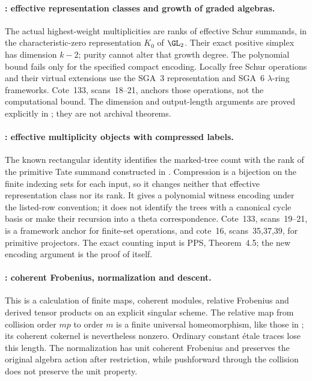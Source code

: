 \paragraph{: effective representation classes and growth of graded algebras.}
The actual highest-weight multiplicities are ranks of effective Schur
summands, in the characteristic-zero representation $K_0$ of $\GL_2$.
Their exact positive simplex has dimension $k-2$; purity cannot alter
that growth degree. The polynomial bound fails only for the specified
compact encoding. Locally free Schur operations and their virtual
extensions use the SGA~3 representation and SGA~6 $\lambda$-ring
frameworks. Cote~133, scans~18--21, anchors those operations, not the
computational bound. The dimension and output-length arguments are
proved explicitly in ; they are not archival theorems.

\paragraph{: effective multiplicity objects with compressed labels.}
The known rectangular identity identifies the marked-tree count with
the rank of the primitive Tate summand constructed in .
Compression is a bijection on the finite indexing sets for each input,
so it changes neither that effective representation class nor its rank.
It gives a polynomial witness encoding under the listed-row convention;
it does not identify the trees with a canonical cycle basis or make their
recursion into a theta correspondence. Cote~133, scans~19--21, is a
framework anchor for finite-set operations, and cote~16, scans~35,37,39,
for primitive projectors. The exact counting input is PPS, Theorem~4.5;
the new encoding argument is the proof of  itself.



\paragraph{: coherent Frobenius, normalization and descent.}

This is a calculation of finite maps, coherent modules, relative
Frobenius and derived tensor products on an explicit singular scheme.
The relative map from collision order $mp$ to order $m$ is a finite
universal homeomorphism, like those in ; its coherent cokernel
is nevertheless nonzero. Ordinary constant \'etale traces lose this
length. The normalization has unit coherent Frobenius and preserves
the original algebra action after restriction, while pushforward
through the collision does not preserve the unit property.


